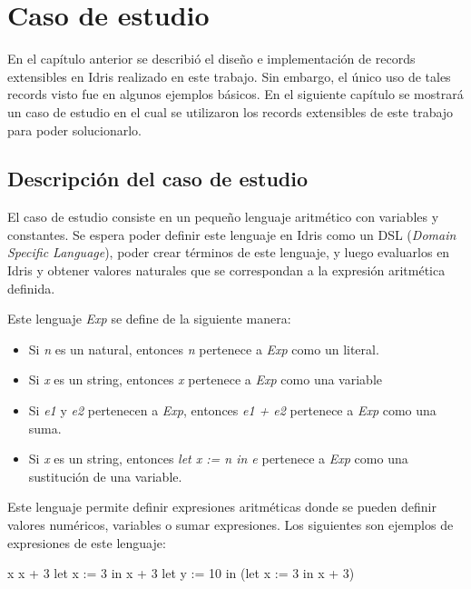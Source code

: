 
\chapter{Caso de estudio}
\label{ch:4}

En el capítulo anterior se describió el diseño e implementación de records extensibles en Idris realizado en este trabajo. Sin embargo, el único uso de tales records visto fue en algunos ejemplos básicos. En el siguiente capítulo se mostrará un caso de estudio en el cual se utilizaron los records extensibles de este trabajo para poder solucionarlo.

\section{Descripción del caso de estudio}

El caso de estudio consiste en un pequeño lenguaje aritmético con variables y constantes. Se espera poder definir este lenguaje en Idris como un DSL (\textit{Domain Specific Language}), poder crear términos de este lenguaje, y luego evaluarlos en Idris y obtener valores naturales que se correspondan a la expresión aritmética definida.

Este lenguaje \textit{Exp} se define de la siguiente manera:

\begin{itemize}
\item Si \textit{n} es un natural, entonces \textit{n} pertenece a \textit{Exp} como un literal.
\item Si \textit{x} es un string, entonces \textit{x} pertenece a \textit{Exp} como una variable
\item Si \textit{e1} y \textit{e2} pertenecen a \textit{Exp}, entonces \textit{e1 + e2} pertenece a \textit{Exp} como una suma.
\item Si \textit{x} es un string, entonces \textit{let x := n in e} pertenece a \textit{Exp} como una sustitución de una variable.
\end{itemize}

Este lenguaje permite definir expresiones aritméticas donde se pueden definir valores numéricos, variables o sumar expresiones. Los siguientes son ejemplos de expresiones de este lenguaje:

\begin{code}
x
x + 3
let x := 3 in x + 3
let y := 10 in (let x := 3 in x + 3)
\end{code}

